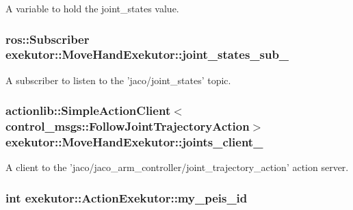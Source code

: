 \-A variable to hold the joint\-\_\-states value. 

\hypertarget{classexekutor_1_1MoveHandExekutor_aa5b9de638dc4a9eb44f68d01e5e19ede}{
\subsubsection[{joint\-\_\-states\-\_\-sub\-\_\-}]{\setlength{\rightskip}{0pt plus 5cm}ros\-::\-Subscriber {\bf exekutor\-::\-Move\-Hand\-Exekutor\-::joint\-\_\-states\-\_\-sub\-\_\-}}}\label{classexekutor_1_1MoveHandExekutor_aa5b9de638dc4a9eb44f68d01e5e19ede}


\-A subscriber to listen to the 'jaco/joint\-\_\-states' topic. 

\hypertarget{classexekutor_1_1MoveHandExekutor_a0ac14498741573561e4b6bb25fb9e2ce}{
\subsubsection[{joints\-\_\-client\-\_\-}]{\setlength{\rightskip}{0pt plus 5cm}actionlib\-::\-Simple\-Action\-Client$<$control\-\_\-msgs\-::\-Follow\-Joint\-Trajectory\-Action$>$ {\bf exekutor\-::\-Move\-Hand\-Exekutor\-::joints\-\_\-client\-\_\-}}}\label{classexekutor_1_1MoveHandExekutor_a0ac14498741573561e4b6bb25fb9e2ce}


\-A client to the 'jaco/jaco\-\_\-arm\-\_\-controller/joint\-\_\-trajectory\-\_\-action' action server. 

\hypertarget{classexekutor_1_1ActionExekutor_a31644a88e4d0166c2d3a70bab9eb5b99}{
\subsubsection[{my\-\_\-peis\-\_\-id}]{\setlength{\rightskip}{0pt plus 5cm}int {\bf exekutor\-::\-Action\-Exekutor\-::my\-\_\-peis\-\_\-id}}}\label{classexekutor_1_1ActionExekutor_a31644a88e4d0166c2d3a70bab9eb5b99}


